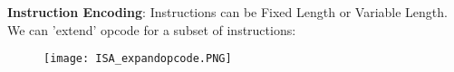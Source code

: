 \documentclass[a4paper,landscape]{article}
\newcommand{\rnname}[1]{\textbf{#1}}
\begin{document}
\begin{multicols*}{4}
\begin{flatitemize}
\iffalse
\item \rnname{Addressing Mode}:

\vspace{-2em}
\begin{figure}[H]
  \texttt{[image: ISA\_addressingmode.PNG]}
\end{figure}
\vspace{-1.5em}
\fi
\item \rnname{Instruction Encoding}:
Instructions can be Fixed Length or Variable Length. \\
We can 'extend' opcode for a subset of instructions:
\vspace{-1em}
\begin{figure}[H]
  \texttt{[image: ISA\_expandopcode.PNG]}
\end{figure}
\vspace{-1.5em}
\end{flatitemize}


\end{multicols*}
\end{document}

